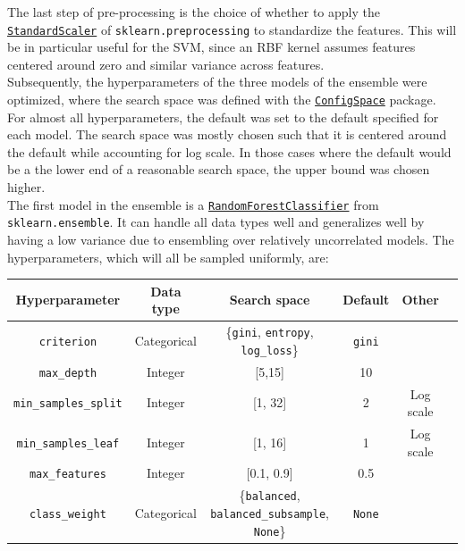 \documentclass[11pt]{article}
\begin{document}
The last step of pre-processing is  the choice of whether to apply the \href{https://scikit-learn.org/stable/modules/generated/sklearn.preprocessing.StandardScaler.html}{\texttt{StandardScaler}} of \texttt{sklearn.preprocessing} to standardize the features. This will be in particular useful for the SVM, since an RBF kernel assumes features centered around zero and similar variance across features. \\

Subsequently, the hyperparameters of the three models of the ensemble were optimized, where the search space was defined with the \href{https://automl.github.io/ConfigSpace/main/}{\texttt{ConfigSpace}} package. For almost all hyperparameters, the default was set to the default specified for each model. The search space was mostly chosen such that it is centered around the default while accounting for log scale. In those cases where the default would be a the lower end of a reasonable search space, the upper bound was chosen higher. \\

The first model in the ensemble is a \href{https://scikit-learn.org/stable/modules/generated/sklearn.ensemble.RandomForestClassifier.html}{\texttt{RandomForestClassifier}} from \texttt{sklearn.ensemble}. It can handle all data types well and generalizes well by having a low variance due to ensembling over relatively uncorrelated models. The hyperparameters, which will all be sampled uniformly, are:

\vspace{-0.3cm}
\begin{table}[H]
\centering
\begin{tabular}{ | c | c | c | c | c | c | }
 \hline
  Hyperparameter & Data type & Search space & Default & Other \\
 \hline
 \texttt{criterion} & Categorical & \{\texttt{gini}, \texttt{entropy}, \texttt{log\_loss}\} & \texttt{gini} &   \\ 
 \texttt{max\_depth}  & Integer & [5,15] & 10 &  \\ 
 \texttt{min\_samples\_split} & Integer & [1, 32] & 2 & Log scale \\ 
 \texttt{min\_samples\_leaf} & Integer & [1, 16] & 1 & Log scale  \\ 
 \texttt{max\_features} & Integer & [0.1, 0.9] & 0.5 &   \\  
 \texttt{class\_weight} & Categorical & \{\texttt{balanced}, \texttt{balanced\_subsample}, \texttt{None}\}  & \texttt{None} &  \\ 
 \hline
\end{tabular}
\end{table}
\vspace{-0.3cm}
\end{document}
